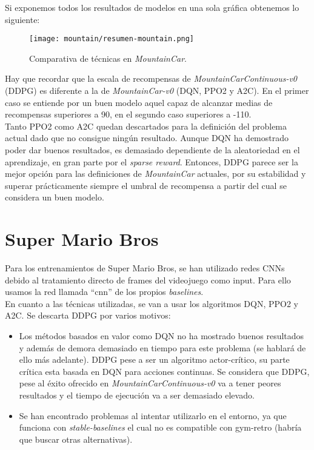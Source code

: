\documentclass[11pt,fleqn]{book} %
\begin{document}
Si exponemos todos los resultados de modelos en una sola gráfica obtenemos lo siguiente:

\begin{figure}[H]
	\centering\texttt{[image: mountain/resumen-mountain.png]}
	\caption{Comparativa de técnicas en \textit{MountainCar}.}
	\label{fig:mountainresumen} %
\end{figure}

Hay que recordar que la escala de recompensas de \textit{MountainCarContinuous-v0} (DDPG) es diferente a la de \textit{MountainCar-v0} (DQN, PPO2 y A2C). En el primer caso se entiende por un buen modelo aquel capaz de alcanzar medias de recompensas superiores a 90, en el segundo caso superiores a -110. \\

Tanto PPO2 como A2C quedan descartados para la definición del problema actual dado que no consigue ningún resultado. Aunque DQN ha demostrado poder dar buenos resultados, es demasiado dependiente de la aleatoriedad en el aprendizaje, en gran parte por el \textit{sparse reward}. Entonces, DDPG parece ser la mejor opción para las definiciones de \textit{MountainCar} actuales, por su estabilidad y superar prácticamente siempre el umbral de recompensa a partir del cual se considera un buen modelo.

\section{Super Mario Bros}\label{expmario}

Para los entrenamientos de Super Mario Bros, se han utilizado redes CNNs debido al tratamiento directo de frames del videojuego como input. Para ello usamos la red llamada ``cnn'' de los propios \textit{baselines}. \cite{article:redesbaselines} \\

En cuanto a las técnicas utilizadas, se van a usar los algoritmos DQN, PPO2 y A2C. Se descarta DDPG por varios motivos: \\

\begin{itemize}
	\item Los métodos basados en valor como DQN no ha mostrado buenos resultados y además de demora demasiado en tiempo para este problema (se hablará de ello más adelante). DDPG pese a ser un algoritmo actor-crítico, su parte crítica esta basada en DQN para acciones continuas. Se considera que DDPG, pese al éxito ofrecido en \textit{MountainCarContinuous-v0} va a tener peores resultados y el tiempo de ejecución va a ser demasiado elevado. \\
	
	\item Se han encontrado problemas al intentar utilizarlo en el entorno, ya que funciona con \textit{stable-baselines} el cual no es compatible con gym-retro (habría que buscar otras alternativas). \\
\end{itemize}
\end{document}
